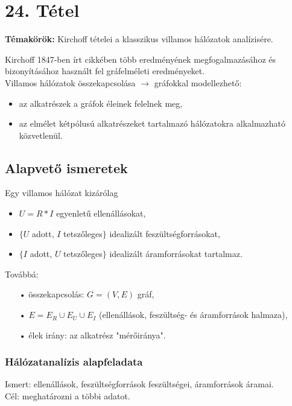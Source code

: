 
\setcounter{chapter}{24}
\chapter*{24. Tétel}

\textbf{Témakörök:} Kirchoff tételei a klasszikus villamos hálózatok analízisére.

\noindent\hrulefill

Kirchoff 1847-ben írt cikkében több eredményének megfogalmazásához és bizonyításához használt fel gráfelméleti eredményeket.\\
\newline
Villamos hálózatok összekapcsolása $\rightarrow$ gráfokkal modellezhető:
\begin{itemize}
\item az alkatrészek a gráfok éleinek felelnek meg,
\item az elmélet kétpólusú alkatrészeket tartalmazó hálózatokra alkalmazható közvetlenül.
\end{itemize}

\section*{Alapvető ismeretek}
Egy villamos hálózat kizárólag
\begin{itemize}
\item $U=R*I$ egyenletű ellenállásokat,
\item $\lbrace U$ adott, $I$ tetszőleges$\rbrace$ idealizált feszültségforrásokat,
\item $\lbrace I$ adott, $U$ tetszőleges$\rbrace$ idealizált áramforrásokat tartalmaz.
\end{itemize}
Továbbá:
\begin{itemize}
\item[•] összekapcsolás: $G=(V,E)$ gráf,
\item[•] $E=E_{R}\cup E_{U}\cup E_{I}$ (ellenállások, feszültség- és áramforrások halmaza),
\item[•] élek irány: az alkatrész "mérőiránya".
\end{itemize}

\subsection*{Hálózatanalízis alapfeladata}
Ismert: ellenállások, feszültségforrások feszültségei, áramforrások áramai.\\
Cél: meghatározni a többi adatot.

